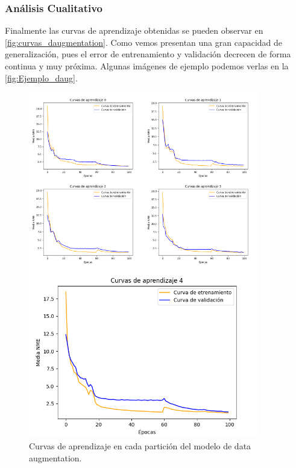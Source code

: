         
        \subsubsection*{Análisis Cualitativo}
        \noindent Finalmente las curvas de aprendizaje obtenidas se pueden observar en \autoref{fig:curvas_daugmentation}. Como vemos presentan una gran capacidad de generalización, pues el error de entrenamiento y validación decrecen de forma continua y muy próxima. Algunas imágenes de ejemplo podemos verlas en la \autoref{fig:Ejemplo_daug}.

        \begin{figure}[H]
            \centering
            \includegraphics[width=0.9\textwidth]{img/curvas_daugmentation.png}
            \caption{Curvas de aprendizaje en cada partición del modelo de data augmentation.}
            \label{fig:curvas_daugmentation}
        \end{figure}

